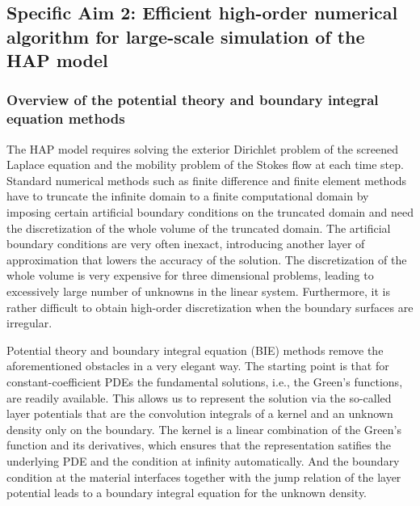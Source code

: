 \subsection{Specific Aim 2: Efficient high-order numerical algorithm for large-scale simulation of the HAP model}\label{subsec:specific_aim_2}
\subsubsection{Overview of the potential theory and boundary integral equation methods}
The HAP model requires solving the exterior Dirichlet problem of the screened Laplace
equation and the mobility problem of the Stokes flow at each time step.
Standard numerical methods such as finite difference and finite element
methods have to truncate the infinite domain to a finite
computational domain by imposing certain artificial boundary conditions
on the truncated domain and need the discretization of the whole volume
of the truncated domain. The artificial boundary conditions are very often
inexact, introducing another layer of approximation that
lowers the accuracy of the solution. The discretization of the whole volume is
very expensive
for three dimensional problems, leading to excessively large number of unknowns in
the linear system. Furthermore, it is rather difficult to obtain high-order
discretization when the boundary surfaces are irregular.

Potential theory and boundary integral equation (BIE) methods remove the aforementioned
obstacles in a very elegant way. The starting point is that for constant-coefficient
PDEs the fundamental solutions, i.e., the Green's functions, are readily available.
This allows us to represent the solution via the so-called layer potentials
that are the convolution integrals of a kernel and an unknown density
only on the boundary. The kernel is a linear combination of the Green's function
and its derivatives, which ensures that the representation satifies the underlying
PDE and the condition at infinity automatically. And the boundary condition
at the material interfaces together with the jump relation of the layer potential
leads to a boundary integral equation for the unknown density.

